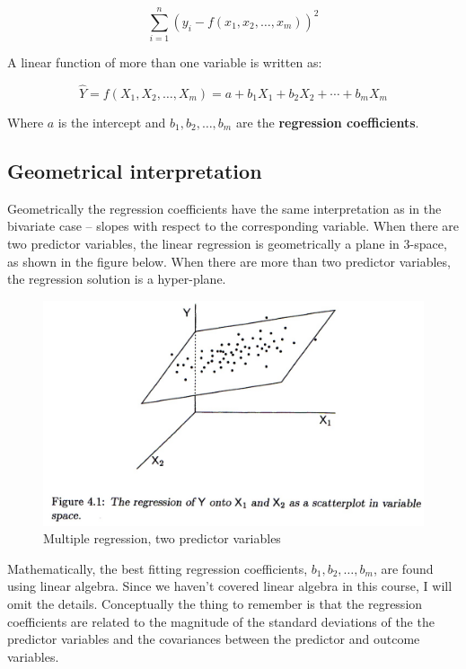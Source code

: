 \documentclass[]{book}
\theoremstyle{definition}
\theoremstyle{definition}
\theoremstyle{definition}
\theoremstyle{remark}
\begin{document}
\[
\sum_{i=1}^n(y_i - f(x_1, x_2,\ldots, x_m))^2
\]

A linear function of more than one variable is written as:

\[
\widehat{Y} = f(X_1, X_2,\ldots,X_m) = a + b_1X_1 + b_2X_2 + \cdots + b_mX_m
\]

Where \(a\) is the intercept and \(b_1, b_2,\ldots,b_m\) are the
\textbf{regression coefficients}.

\hypertarget{geometrical-interpretation}{%
\subsection{Geometrical
interpretation}\label{geometrical-interpretation}}

Geometrically the regression coefficients have the same interpretation
as in the bivariate case -- slopes with respect to the corresponding
variable. When there are two predictor variables, the linear regression
is geometrically a plane in 3-space, as shown in the figure below. When
there are more than two predictor variables, the regression solution is
a hyper-plane.

\begin{figure}
\centering
\includegraphics{./figures/fig-regression-variable-space.png}
\caption{Multiple regression, two predictor variables}
\end{figure}

Mathematically, the best fitting regression coefficients,
\(b_1, b_2,\ldots,b_m\), are found using linear algebra. Since we
haven't covered linear algebra in this course, I will omit the details.
Conceptually the thing to remember is that the regression coefficients
are related to the magnitude of the standard deviations of the the
predictor variables and the covariances between the predictor and
outcome variables.
\end{document}
